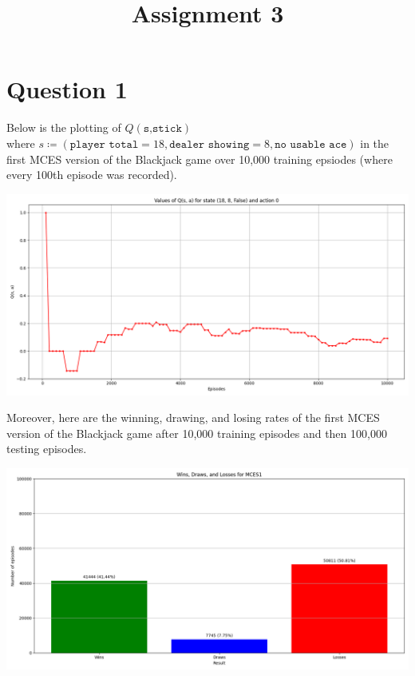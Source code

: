 \documentclass{article}
\title{Assignment 3}
\date{}
\author{}
\begin{document}
\maketitle
\section*{Question 1}
Below is the plotting of $Q(\texttt{s,stick})$\\ 
where $s\coloneq(\texttt{player total} = 18, \texttt{dealer showing} = 8, \texttt{no usable ace})$
in the first MCES version of the Blackjack game over 10,000 training epsiodes (where every 100th episode was recorded).
\begin{center}
    \includegraphics[scale=0.4]{Q_values.png}
\end{center}\par 
Moreover, here are the winning, drawing, and losing rates of the first MCES version of the Blackjack game after 10,000 training episodes and then 100,000 testing episodes.
\begin{center}
    \includegraphics[scale=0.4]{MCES1_Wins_Draws_Losses.png}
\end{center}
\end{document}
